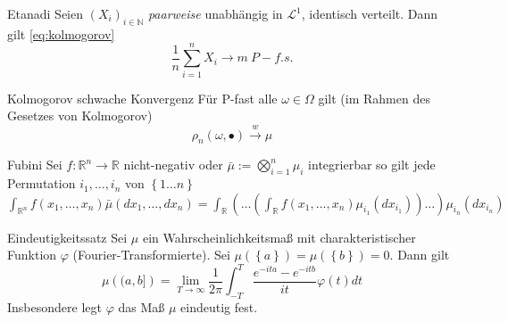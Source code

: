 \documentclass[avery5371,grid,frame]{flashcards} %
\begin{document}
\begin{flashcard}[Satz]{Etanadi}
  Seien $\left(X_{i}\right)_{i\in\mathbb{N}}$ \emph{paarweise }unabhängig
in $\mathcal{L}^{1}$, identisch verteilt. Dann gilt \ref{eq:kolmogorov}
\[
\frac{1}{n}\sum_{i=1}^{n}X_{i}\to m\ P-f.s.
\]

\end{flashcard}

\begin{flashcard}[Satz]{Kolmogorov schwache Konvergenz}
Für P-fast alle $\omega\in\Omega$ gilt (im Rahmen des Gesetzes von
Kolmogorov)
\[
\rho_{n}\left(\omega,\bullet\right)\overset{w}{\longrightarrow}\mu
\]
\end{flashcard}

\begin{flashcard}[Satz]{Fubini}
  Sei $f:\mathbb{R}^{n}\to\mathbb{R}$ nicht-negativ oder $\bar{\mu}:=\bigotimes_{i=1}^{n}\mu_{i}$
integrierbar so gilt jede Permutation $i_{1},\ldots,i_{n}$ von $\left\{ 1\ldots n\right\} $
$
\int_{\mathbb{R}^{n}}f\left(x_{1},\ldots,x_{n}\right)\bar{\mu}\left(dx_{1},\ldots,dx_{n}\right)=\int_{\mathbb{R}}\left(\ldots\left(\int_{\mathbb{R}}f\left(x_{1},\ldots,x_{n}\right)\mu_{i_{1}}\left(dx_{i_{1}}\right)\right)\ldots\right)\mu_{i_{n}}\left(dx_{i_{n}}\right)
$
\end{flashcard}

\begin{flashcard}[Satz]{Eindeutigkeitssatz}
  Sei $\mu$ ein Wahrscheinlichkeitsmaß mit charakteristischer Funktion
$\varphi$ (Fourier-Transformierte). Sei $\mu\left(\left\{ a\right\} \right)=\mu\left(\left\{ b\right\} \right)=0$.
Dann gilt
\[
\mu\left((a,b]\right)=\lim_{T\to\infty}\frac{1}{2\pi}\int_{-T}^{T}\frac{e^{-ita}-e^{-itb}}{it}\varphi\left(t\right)dt
\]
Insbesondere legt $\varphi$ das Maß $\mu$ eindeutig fest. 
\end{flashcard}


\end{document}
